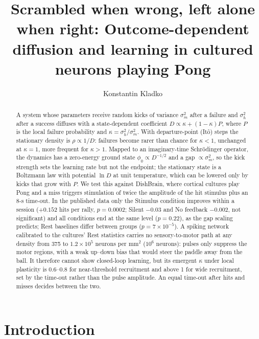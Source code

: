 \documentclass[pre,twocolumn,superscriptaddress,showpacs=false,amsmath,amssymb,nofootinbib]{revtex4-2}
\begin{document}
\title{Scrambled when wrong, left alone when right: Outcome-dependent diffusion and learning in cultured neurons playing Pong}

\author{Konstantin Kladko}

\begin{abstract}
A system whose parameters receive random kicks of variance $\sigma_m^2$ after a failure and $\sigma_h^2$ after a success diffuses with a state-dependent coefficient $D\propto\kappa+(1-\kappa)P$, where $P$ is the local failure probability and $\kappa=\sigma_h^2/\sigma_m^2$. With departure-point (It\^o) steps the stationary density is $\rho\propto1/D$: failures become rarer than chance for $\kappa<1$, unchanged at $\kappa=1$, more frequent for $\kappa>1$. Mapped to an imaginary-time Schr\"odinger operator, the dynamics has a zero-energy ground state $\phi_0\propto D^{-1/2}$ and a gap $\propto\sigma_m^2$, so the kick strength sets the learning rate but not the endpoint; the stationary state is a Boltzmann law with potential $\ln D$ at unit temperature, which can be lowered only by kicks that grow with $P$. We test this against DishBrain, where cortical cultures play Pong and a miss triggers stimulation of twice the amplitude of the hit stimulus plus an 8-s time-out. In the published data only the Stimulus condition improves within a session ($+0.152$ hits per rally, $p=0.0002$; Silent $-0.03$ and No feedback $-0.002$, not significant) and all conditions end at the same level ($p=0.22$), as the gap scaling predicts; Rest baselines differ between groups ($p=7\times10^{-5}$). A spiking network calibrated to the cultures' Rest statistics carries no sensory-to-motor path at any density from 375 to $1.2\times10^5$ neurons per mm$^2$ ($10^6$ neurons): pulses only suppress the motor regions, with a weak up--down bias that would steer the paddle away from the ball. It therefore cannot show closed-loop learning, but its emergent $\kappa$ under local plasticity is 0.6--0.8 for near-threshold recruitment and above 1 for wide recruitment, set by the time-out rather than the pulse amplitude. An equal time-out after hits and misses decides between the two.
\end{abstract}

\maketitle

\section{Introduction}
\end{document}
